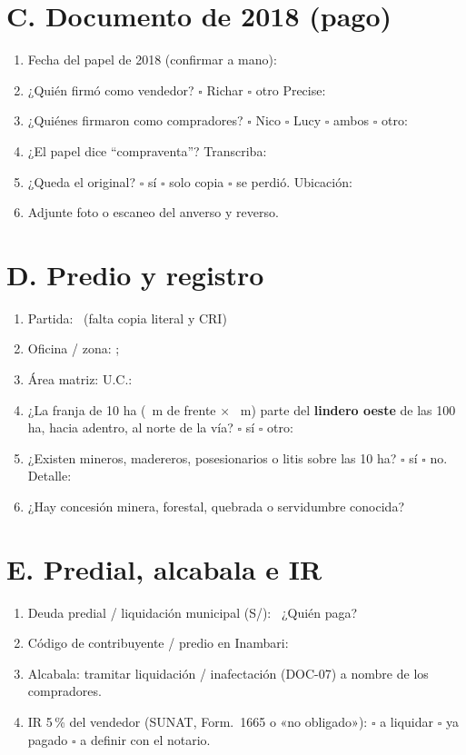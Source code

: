 \documentclass[12pt,a4paper]{article}
\begin{document}
\section*{C. Documento de 2018 (pago)}
\begin{enumerate}[leftmargin=1.15cm]
\item Fecha del papel de 2018 (confirmar a mano): \FechaPago
\item ¿Quién firmó como vendedor? \quad $\square$ Richar \quad $\square$ otro \quad Precise: \linea[11.2cm]
\item ¿Quiénes firmaron como compradores? \quad $\square$ Nico \quad $\square$ Lucy \quad $\square$ ambos \quad $\square$ otro: \linea[11.2cm]
\item ¿El papel dice ``compraventa''? Transcriba: \linea[8.5cm]
\item ¿Queda el original? \quad $\square$ sí \quad $\square$ solo copia \quad $\square$ se perdió. Ubicación: \linea[4.4cm]
\item Adjunte foto o escaneo del anverso y reverso.
\end{enumerate}

\section*{D. Predio y registro}
\begin{enumerate}[leftmargin=1.15cm]
\item Partida: \textbf{\PartidaMatriz}\ (falta copia literal y CRI)
\item Oficina / zona: \textbf{\OficinaRegistral}; \textbf{\ZonaRegistral}
\item Área matriz: \textbf{\AreaMatriz} \quad U.C.: \textbf{\UnidadCatastral}
\item ¿La franja de 10 ha (\FrenteM\ m de frente $\times$ \FondoM\ m) parte del \textbf{lindero oeste} de las 100 ha, hacia adentro, al norte de la vía? \quad $\square$ sí \quad $\square$ otro: \linea[3.2cm]
\item ¿Existen mineros, madereros, posesionarios o litis sobre las 10 ha? \quad $\square$ sí \quad $\square$ no. Detalle: \linea[5.5cm]
\item ¿Hay concesión minera, forestal, quebrada o servidumbre conocida? \linea[7.2cm]
\end{enumerate}

\section*{E. Predial, alcabala e IR}
\begin{enumerate}[leftmargin=1.15cm]
\item Deuda predial / liquidación municipal (S/): \DeudaPredialReferencia\ ¿Quién paga? \linea[5cm]
\item Código de contribuyente / predio en Inambari: \linea[8cm]
\item Alcabala: tramitar liquidación / inafectación (DOC-07) a nombre de los compradores.
\item IR 5\,\% del vendedor (SUNAT, Form.\ 1665 o «no obligado»): \quad $\square$ a liquidar \quad $\square$ ya pagado \quad $\square$ a definir con el notario.
\end{enumerate}
\end{document}
